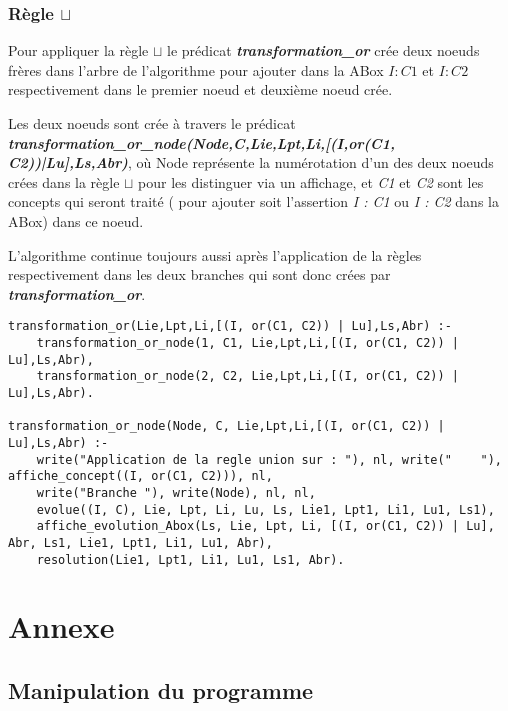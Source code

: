 \documentclass{rapportECL}
\begin{document}
\subsubsection{Règle  \(\sqcup\)}

Pour appliquer la règle \textit{\( \sqcup \)} le prédicat \textbf{\textit{transformation\_or}} crée deux noeuds frères dans l'arbre de l'algorithme pour ajouter dans la ABox \textit{\( I : C1 \)} et \textit{\( I : C2 \)} respectivement dans le premier noeud et deuxième noeud crée.

Les deux noeuds sont crée à travers le prédicat \textbf{\textit{transformation\_or\_node(Node,C,Lie,Lpt,Li,[(I,or(C1, C2))|Lu],Ls,Abr)}}, où Node représente la numérotation d'un des deux noeuds crées dans la règle \textit{\(\sqcup\)} pour les distinguer via un affichage, et \textit{C1} et \textit{C2} sont les concepts qui seront traité ( pour ajouter soit l'assertion \textit{ I : C1} ou \textit{I : C2} dans la ABox) dans ce noeud.

L'algorithme continue toujours aussi après l'application de la règles respectivement dans les deux branches qui sont donc crées par \textbf{\textit{transformation\_or}}.

\begin{lstlisting}[style=prologStyle, caption={Application de la regle \(\sqcup\)}, label={or}]
transformation_or(Lie,Lpt,Li,[(I, or(C1, C2)) | Lu],Ls,Abr) :-
    transformation_or_node(1, C1, Lie,Lpt,Li,[(I, or(C1, C2)) | Lu],Ls,Abr),
    transformation_or_node(2, C2, Lie,Lpt,Li,[(I, or(C1, C2)) | Lu],Ls,Abr).

transformation_or_node(Node, C, Lie,Lpt,Li,[(I, or(C1, C2)) | Lu],Ls,Abr) :-
    write("Application de la regle union sur : "), nl, write("    "), affiche_concept((I, or(C1, C2))), nl,
    write("Branche "), write(Node), nl, nl,
    evolue((I, C), Lie, Lpt, Li, Lu, Ls, Lie1, Lpt1, Li1, Lu1, Ls1),
    affiche_evolution_Abox(Ls, Lie, Lpt, Li, [(I, or(C1, C2)) | Lu], Abr, Ls1, Lie1, Lpt1, Li1, Lu1, Abr),
    resolution(Lie1, Lpt1, Li1, Lu1, Ls1, Abr).
\end{lstlisting}

\newpage

\appendix

\section{Annexe}

\subsection{Manipulation du programme}
\end{document}
